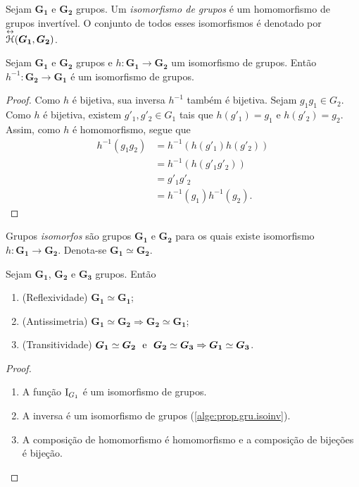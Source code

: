 \begin{definition}
Sejam $\bm{G_1}$ e $\bm{G_2}$ grupos. Um \emph{isomorfismo de grupos} é um homomorfismo de grupos invertível. O conjunto de todos esses isomorfismos é denotado por $\overset{\leftrightarrow}{\mathcal{H}}(\bm{G_1},\bm{G_2})$.
\end{definition}

\begin{proposition}
\label{alge:prop.gru.isoinv}
Sejam $\bm{G_1}$ e $\bm{G_2}$ grupos e $h: \bm{G_1} \to \bm{G_2}$ um isomorfismo de grupos. Então $h^{-1}: \bm{G_2} \to \bm{G_1}$ é um isomorfismo de grupos.
\end{proposition}
\begin{proof}
Como $h$ é bijetiva, sua inversa $h^{-1}$ também é bijetiva. Sejam $g_1g_1 \in G_2$. Como $h$ é bijetiva, existem $g'_1,g'_2 \in G_1$ tais que $h(g'_1)=g_1$ e $h(g'_2)=g_2$. Assim, como $h$ é homomorfismo, segue que
	\begin{align*}
	h^{-1}(g_1g_2) &= h^{-1}(h(g'_1)h(g'_2)) \\
					&= h^{-1}(h(g'_1g'_2)) \\
					&= g'_1g'_2 \\
					&= h^{-1}(g_1)h ^{-1}(g_2).
	\end{align*}
\end{proof}

\begin{definition}
Grupos \emph{isomorfos} são grupos $\bm{G_1}$ e $\bm{G_2}$ para os quais existe isomorfismo $h: \bm{G_1} \to \bm{G_2}$. Denota-se $\bm{G_1} \simeq \bm{G_2}$.
\end{definition}

\begin{proposition}
Sejam $\bm{G_1}$, $\bm{G_2}$ e $\bm{G_3}$ grupos. Então
	\begin{enumerate}
	\item (Reflexividade) $\bm{G_1} \simeq \bm{G_1}$;
	\item (Antissimetria) $\bm{G_1} \simeq \bm{G_2} \Rightarrow \bm{G_2} \simeq \bm{G_1}$;
	\item (Transitividade) $\bm{G_1} \simeq \bm{G_2} \text{\ \ e\ \ } \bm{G_2} \simeq \bm{G_3} \Rightarrow \bm{G_1} \simeq \bm{G_3}$.
	\end{enumerate}
\end{proposition}
\begin{proof}
	\begin{enumerate}
	\item A função $\mathrm{I}_{G_1}$ é um isomorfismo de grupos.
	\item A inversa é um isomorfismo de grupos (\ref{alge:prop.gru.isoinv}).
	\item A composição de homomorfismo é homomorfismo e a composição de bijeções é bijeção.
	\end{enumerate}
\end{proof}

